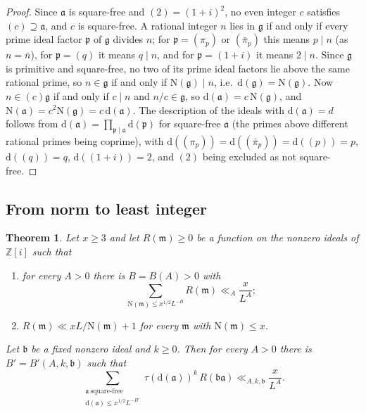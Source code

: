 \documentclass[11pt]{amsart}
\newtheorem{theorem}{Theorem}[section]
\theoremstyle{remark}
\newcommand{\Z}{\mathbb{Z}}
\newcommand{\N}{\mathrm{N}}
\newcommand{\fa}{\mathfrak{a}}
\newcommand{\fb}{\mathfrak{b}}
\newcommand{\fg}{\mathfrak{g}}
\newcommand{\fm}{\mathfrak{m}}
\newcommand{\fp}{\mathfrak{p}}
\newcommand{\dd}{\mathrm{d}}
\begin{document}
\begin{proof}
Since $\fa$ is square-free and $(2)=(1+i)^2$, no even integer $c$ satisfies $(c)\supseteq\fa$, and $c$ is square-free. A rational integer $n$ lies in $\fg$ if and only if every prime ideal factor $\fp$ of $\fg$ divides $n$; for $\fp=(\pi_p)$ or $(\bar\pi_p)$ this means $p\mid n$ (as $n=\bar n$), for $\fp=(q)$ it means $q\mid n$, and for $\fp=(1+i)$ it means $2\mid n$. Since $\fg$ is primitive and square-free, no two of its prime ideal factors lie above the same rational prime, so $n\in\fg$ if and only if $\N(\fg)\mid n$, i.e.\ $\dd(\fg)=\N(\fg)$. Now $n\in(c)\fg$ if and only if $c\mid n$ and $n/c\in\fg$, so $\dd(\fa)=c\,\N(\fg)$, and $\N(\fa)=c^2\N(\fg)=c\,\dd(\fa)$. The description of the ideals with $\dd(\fa)=d$ follows from $\dd(\fa)=\prod_{\fp\mid\fa}\dd(\fp)$ for square-free $\fa$ (the primes above different rational primes being coprime), with $\dd((\pi_p))=\dd((\bar\pi_p))=\dd((p))=p$, $\dd((q))=q$, $\dd((1+i))=2$, and $(2)$ being excluded as not square-free.
\end{proof}

\subsection{From norm to least integer}

\begin{theorem}\label{thm:main}
Let $x\ge 3$ and let $R(\fm)\ge 0$ be a function on the nonzero ideals of $\Z[i]$ such that
\begin{enumerate}
\item[\textup{(i)}] for every $A>0$ there is $B=B(A)>0$ with
\[
\sum_{\N(\fm)\le x^{1/2}L^{-B}}R(\fm)\ll_A \frac{x}{L^{A}};
\]
\item[\textup{(ii)}] $R(\fm)\ll x L/\N(\fm)+1$ for every $\fm$ with $\N(\fm)\le x$.
\end{enumerate}
Let $\fb$ be a fixed nonzero ideal and $k\ge 0$. Then for every $A>0$ there is $B'=B'(A,k,\fb)$ such that
\[
\sum_{\substack{\fa\ \mathrm{square\text{-}free}\\ \dd(\fa)\le x^{1/2}L^{-B'}}}\tau(\dd(\fa))^{k}\,R(\fb\fa)\ll_{A,k,\fb} \frac{x}{L^{A}}.
\]
\end{theorem}
\end{document}
